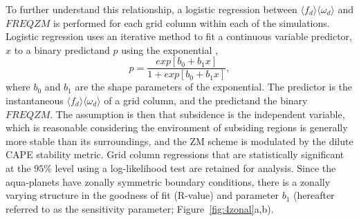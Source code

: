 \documentclass[times]{qjrms4}
\begin{document}
To further understand this relationship, a logistic regression between $\langle f_{d} \rangle \langle \omega_{d} \rangle$ and $FREQZM$ is performed for each grid column within each of the simulations. Logistic regression uses an iterative method to fit a continuous variable predictor, $x$ to a binary predictand $p$ using the exponential \citep{WILKSBOOK},
\begin{equation}
p = \frac{exp{[b_0 + b_1 x]}}{1 + exp{[b_0 + b_1 x]}}, \label{eq:eq6-3}
\end{equation}
where $b_0$ and $b_1$ are the shape parameters of the exponential. The predictor is the instantaneous $\langle f_{d} \rangle \langle \omega_{d} \rangle$ of a grid column, and the predictand the binary $FREQZM$. The assumption is then that subsidence is the independent variable, which is reasonable considering the environment of subsiding regions is generally more stable than its surroundings, and the ZM scheme is modulated by the dilute CAPE stability metric. Grid column regressions that are statistically significant at the $95\%$ level using a log-likelihood test \citep{WILKSBOOK} are retained for analysis. Since the aqua-planets have zonally symmetric boundary conditions, there is a zonally varying structure in the goodness of fit (R-value) and parameter $b_1$ (hereafter referred to as the sensitivity parameter; Figure~\ref{fig:4zonal}a,b).
\end{document}
